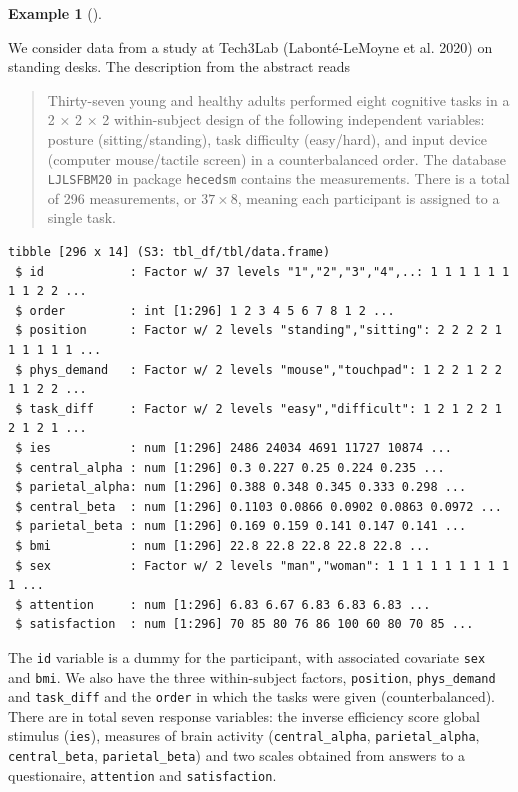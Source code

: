 \documentclass[
  11pt,
  letterpaper,
]{scrbook}
\theoremstyle{definition}
\theoremstyle{definition}
\newtheorem{example}{Example}[chapter]
\theoremstyle{remark}
\begin{document}
\begin{example}[]\protect\hypertarget{exm-standing-desks}{}\label{exm-standing-desks}

We consider data from a study at Tech3Lab (Labonté-LeMoyne et al. 2020)
on standing desks. The description from the abstract reads

\begin{quote}
Thirty-seven young and healthy adults performed eight cognitive tasks in
a 2 × 2 × 2 within-subject design of the following independent
variables: posture (sitting/standing), task difficulty (easy/hard), and
input device (computer mouse/tactile screen) in a counterbalanced order.
The database \texttt{LJLSFBM20} in package \texttt{hecedsm} contains the
measurements. There is a total of 296 measurements, or \(37 \times 8\),
meaning each participant is assigned to a single task.
\end{quote}

\begin{verbatim}
tibble [296 x 14] (S3: tbl_df/tbl/data.frame)
 $ id            : Factor w/ 37 levels "1","2","3","4",..: 1 1 1 1 1 1 1 1 2 2 ...
 $ order         : int [1:296] 1 2 3 4 5 6 7 8 1 2 ...
 $ position      : Factor w/ 2 levels "standing","sitting": 2 2 2 2 1 1 1 1 1 1 ...
 $ phys_demand   : Factor w/ 2 levels "mouse","touchpad": 1 2 2 1 2 2 1 1 2 2 ...
 $ task_diff     : Factor w/ 2 levels "easy","difficult": 1 2 1 2 2 1 2 1 2 1 ...
 $ ies           : num [1:296] 2486 24034 4691 11727 10874 ...
 $ central_alpha : num [1:296] 0.3 0.227 0.25 0.224 0.235 ...
 $ parietal_alpha: num [1:296] 0.388 0.348 0.345 0.333 0.298 ...
 $ central_beta  : num [1:296] 0.1103 0.0866 0.0902 0.0863 0.0972 ...
 $ parietal_beta : num [1:296] 0.169 0.159 0.141 0.147 0.141 ...
 $ bmi           : num [1:296] 22.8 22.8 22.8 22.8 22.8 ...
 $ sex           : Factor w/ 2 levels "man","woman": 1 1 1 1 1 1 1 1 1 1 ...
 $ attention     : num [1:296] 6.83 6.67 6.83 6.83 6.83 ...
 $ satisfaction  : num [1:296] 70 85 80 76 86 100 60 80 70 85 ...
\end{verbatim}

The \texttt{id} variable is a dummy for the participant, with associated
covariate \texttt{sex} and \texttt{bmi}. We also have the three
within-subject factors, \texttt{position}, \texttt{phys\_demand} and
\texttt{task\_diff} and the \texttt{order} in which the tasks were given
(counterbalanced). There are in total seven response variables: the
inverse efficiency score global stimulus (\texttt{ies}), measures of
brain activity (\texttt{central\_alpha}, \texttt{parietal\_alpha},
\texttt{central\_beta}, \texttt{parietal\_beta}) and two scales obtained
from answers to a questionaire, \texttt{attention} and
\texttt{satisfaction}.


\end{example}
\end{document}

